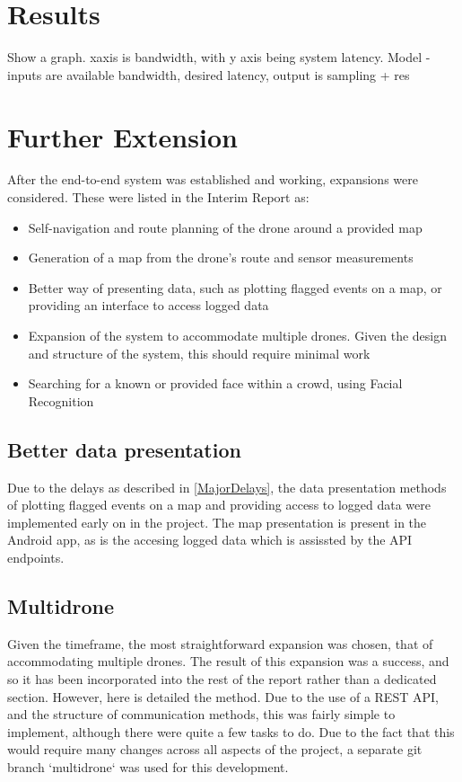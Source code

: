 \documentclass{article}
\begin{document}
\section{Results}

Show a graph. xaxis is bandwidth, with y axis being system latency. Model - inputs are available bandwidth, desired latency, output is sampling + res



\section{Further Extension}
After the end-to-end system was established and working, expansions were considered. These were listed in the Interim Report as:
\begin{itemize}
    \item Self-navigation and route planning of the drone around a provided map
    \item Generation of a map from the drone's route and sensor measurements
    \item Better way of presenting data, such as plotting flagged events on a map, or providing an interface to access logged data
    \item Expansion of the system to accommodate multiple drones. Given the design and structure of the system, this should require minimal work
    \item Searching for a known or provided face within a crowd, using Facial Recognition
\end{itemize}
\subsection{Better data presentation}
Due to the delays as described in \ref{MajorDelays}, the data presentation methods of plotting flagged events on a map and providing access to logged data were implemented early on in the project. The map presentation is present in the Android app, as is the accesing logged data which is assissted by the API endpoints. 

\subsection{Multidrone}
Given the timeframe, the most straightforward expansion was chosen, that of accommodating multiple drones. The result of this expansion was a success, and so it has been incorporated into the rest of the report rather than a dedicated section. However, here is detailed the method. Due to the use of a REST API, and the structure of communication methods, this was fairly simple to implement, although there were quite a few tasks to do. Due to the fact that this would require many changes across all aspects of the project, a separate git branch `multidrone` was used for this development. 
\end{document}
